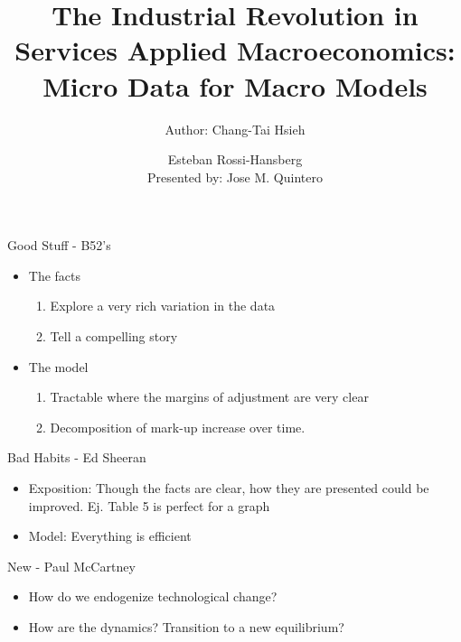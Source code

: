 \documentclass[usenames,dvipsnames,aspectratio=169]{beamer}
\title{The Industrial Revolution in Services  \small{Applied Macroeconomics: Micro Data for Macro Models} }
\author{Author: Chang-Tai Hsieh \and Esteban Rossi-Hansberg \\ Presented by: Jose M. Quintero}
\begin{document}
\begin{frame}
  \titlepage
\end{frame}

\begin{frame}{Good Stuff - B52's}
\begin{itemize}[label=\textcolor{teal}{$\blacktriangleright$}]
    \item The facts
    \begin{enumerate}[label=\textbf{\textcolor{teal}{\arabic*.}}]
        \item Explore a very rich variation in the data
        \item Tell a compelling story
    \end{enumerate}
    \vfill
    \item The model
    \begin{enumerate}[label=\textbf{\textcolor{teal}{\arabic*.}}]
        \item Tractable where the margins of adjustment are very clear
        \item Decomposition of mark-up increase over time. 
    \end{enumerate}
\end{itemize}
\end{frame}

\begin{frame}{Bad Habits - Ed Sheeran}
     \begin{itemize}[label=\textcolor{teal}{$\blacktriangleright$}]
         \item Exposition: Though the facts are clear, how they are presented could be improved. Ej. Table 5 is perfect for a graph
         \vfill
         \item Model: Everything is efficient
     \end{itemize}
\end{frame}

\begin{frame}{New - Paul McCartney} 
    \begin{itemize}[label=\textcolor{teal}{$\blacktriangleright$}]
        \item How do we endogenize technological change? 
        \item How are the dynamics? Transition to a new equilibrium? 
    \end{itemize}
\end{frame}
\end{document}
